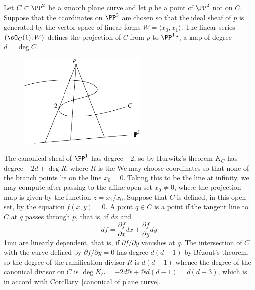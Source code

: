 \begin{example}
Let $C\subset \PP^2$ be a smooth plane curve and let $p$ be a point of $\PP^2$ not on $C$. Suppose that the coordinates on $\PP^2$ are chosen so that the ideal sheaf of $p$ is  
 generated by the vector space of linear forms $W = \langle x_0,x_1\rangle$. 
The linear series $(\sO_C(1), W)$ defines the projection of $C$ from $p$ to $\PP^1` `$, a map of degree
$d = \deg C$.

\begin{figure}   %
\centerline {\includegraphics[height=1.8in]{"main/Fig02-ProjectionPlaneCubic"}}
\end{figure}

The canonical sheaf of $\PP^1$ has degree $-2$, so by Hurwitz's theorem
$K_C$ has degree $ -2d+ \deg R$, where $R$ is the 
We may choose coordinates
so that none of the branch points lie on the line $x_0 = 0$. Taking this to be the line at infinity, we
may compute 
after passing to the affine open set $x_0\neq 0$, where the projection
map is given by the function $z = x_1/x_0$.  Suppose that $C$ is defined, in this open set,
by the equation $f(x,y)= 0$. A point $q\in C$ is a 
%
point if the tangent line to $C$ at $q$
passes through $p$, that is, if $dx$  and 
$$
df = \frac{\partial f}{\partial x} dx + \frac{\partial f}{\partial y} dy
$$
\medmuskip1mu
are linearly dependent, that is, if $\partial f/{\partial y}$ vanishes at $q$. The intersection of 
$C$ with the curve defined by $\partial f/{\partial y}=0$ has degree $d(d-1)$ by B\'ezout's theorem,
so the degree of the ramification divisor $R$ is $d(d-1)$ whence the degree of the canonical
divisor on $C$ is $\deg K_C = -2d@+@d(d-1) = d(d-3)$, which is in accord with 
Corollary~\ref{canonical of plane curve}.
\end{example}

